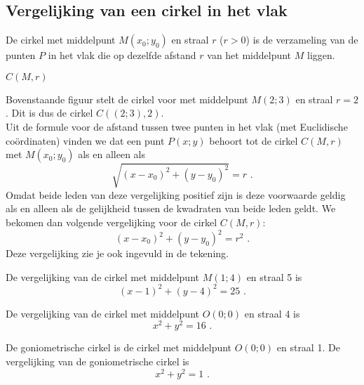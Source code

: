
\subsection{Vergelijking van een cirkel in het vlak}
\noindent

\begin{definitie}
	De cirkel met middelpunt $M(x_0;y_0)$ en straal $r$ ($r>0$) is de verzameling van de punten $P$ in het vlak die op dezelfde afstand $r$ van het middelpunt $M$ liggen.
\end{definitie}

\begin{notatie}
	$C(M,r)$
\end{notatie}



Bovenstaande figuur stelt de cirkel voor met middelpunt $M(2;3)$ en straal $r=2$.
Dit is dus de cirkel $C((2;3),2)$.\\

Uit de formule voor de afstand tussen twee punten in het vlak (met Euclidische co\"ordinaten) vinden we dat een punt $P(x;y)$ behoort tot de cirkel $C(M,r)$ met $M(x_0;y_0)$ als en alleen als
\[
\sqrt {(x-x_0)^2+(y-y_0)^2}=r \text { .}
\]
Omdat beide leden van deze vergelijking positief zijn is deze voorwaarde geldig als en alleen als de gelijkheid tussen de kwadraten van beide leden geldt.
We bekomen dan volgende vergelijking voor de cirkel $C(M,r)$:
\[
(x-x_0)^2+(y-y_0)^2=r^2 \text { .}
\]
Deze vergelijking zie je ook ingevuld in de tekening.

\begin{voorbeeld}
	De vergelijking van de cirkel met middelpunt $M(1;4)$ en straal 5 is
\[
(x-1)^2+(y-4)^2=25 \text { .}
\]
\end{voorbeeld}
\begin{voorbeeld}
	De vergelijking van de cirkel met middelpunt $O(0;0)$ en straal 4 is
\[
x^2+y^2=16 \text { .}
\]
\end{voorbeeld}
\begin{voorbeeld}
	De goniometrische cirkel is de cirkel met middelpunt $O(0;0)$ en straal 1.
De vergelijking van de goniometrische cirkel is
\[
x^2+y^2=1 \text { .}
\]

\end{voorbeeld}

